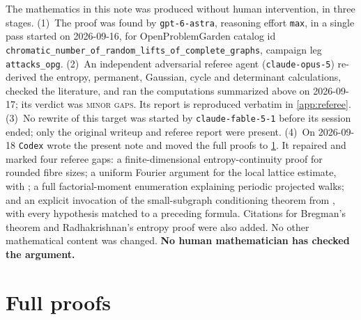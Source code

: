 \documentclass[11pt,a4paper]{article}
\theoremstyle{plain}
\theoremstyle{definition}
\theoremstyle{remark}
\begin{document}
The mathematics in this note was produced without human intervention, in three stages.
(1)~The proof was found by \texttt{gpt-6-astra}, reasoning effort \texttt{max}, in a
single pass started on 2026-09-16, for OpenProblemGarden catalog id
\texttt{chromatic\_number\_of\_random\_lifts\_of\_complete\_graphs}, campaign leg
\texttt{attacks\_opg}.
(2)~An independent adversarial referee agent (\texttt{claude-opus-5}) re-derived the
entropy, permanent, Gaussian, cycle and determinant calculations, checked the literature,
and ran the computations summarized above on 2026-09-17; its verdict was
\textsc{minor gaps}.  Its report is reproduced verbatim in \cref{app:referee}.
(3)~No rewrite of this target was started by \texttt{claude-fable-5-1} before its
session ended; only the original writeup and referee report were present.
(4)~On 2026-09-18 \texttt{Codex} wrote the present note and moved the full proofs to
\cref{app:proofs}.  It repaired and marked four referee gaps: a finite-dimensional
entropy-continuity proof for rounded fibre sizes; a uniform Fourier argument for the
local lattice estimate, with \cite{GJR10}; a full factorial-moment enumeration explaining
periodic projected walks; and an explicit invocation of the small-subgraph conditioning
theorem from \cite{Wormald99}, with every hypothesis matched to a preceding formula.
Citations for Bregman's theorem and Radhakrishnan's entropy proof were also added.  No
other mathematical content was changed.  \textbf{No human mathematician has checked
the argument.}

\appendix
\section{Full proofs}\label{app:proofs}
\end{document}
